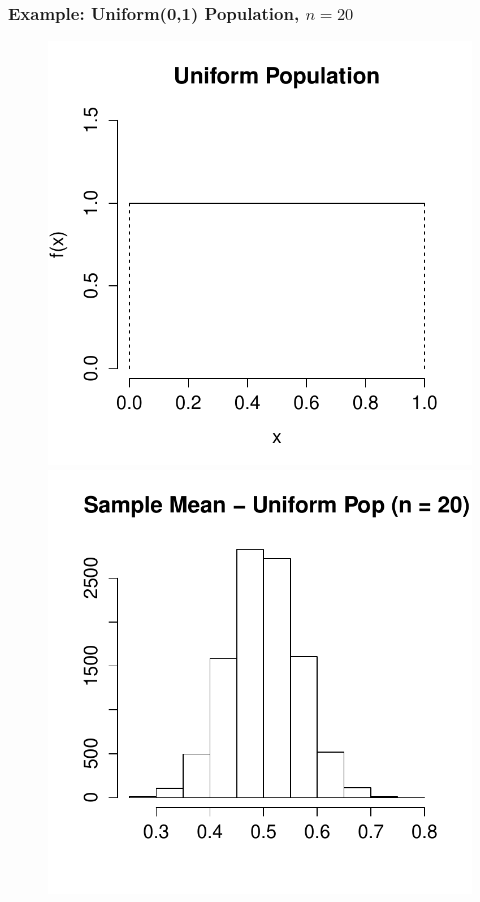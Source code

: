 \begin{frame}
\frametitle{Example: Uniform(0,1) Population, $n = 20$}
\begin{figure}
\centering
\includegraphics[scale = 0.4]{./images/uniform_pdf}
\includegraphics[scale = 0.4]{./images/xbar_uniform}
\end{figure}
\end{frame}
